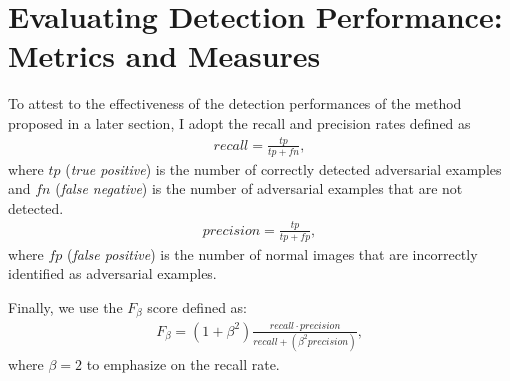 \section{Evaluating Detection Performance: Metrics and Measures}
To attest to the effectiveness of the detection performances of the method
proposed in a later section, I adopt the recall and precision rates defined as
\begin{align} \label{eq:recall}
    recall=\frac{tp}{tp+fn},
\end{align}
where $tp$ (\textit{true positive}) is the number of correctly detected
adversarial examples and $fn$ (\textit{false negative}) is the number of
adversarial examples that are not detected.
\begin{align} \label{eq:precision}
    precision=\frac{tp}{tp+fp},
\end{align}
where $fp$ (\textit{false positive}) is the number of normal images that are
incorrectly identified as adversarial examples.

Finally, we use the $F_{\beta}$ score defined as:
\begin{align} \label{eq:fb}
    F_{\beta}=(1+\beta^{2})\frac{recall\cdot
        precision}{recall+(\beta^{2}precision)},
\end{align}
where $\beta=2$ to emphasize on the recall rate.
